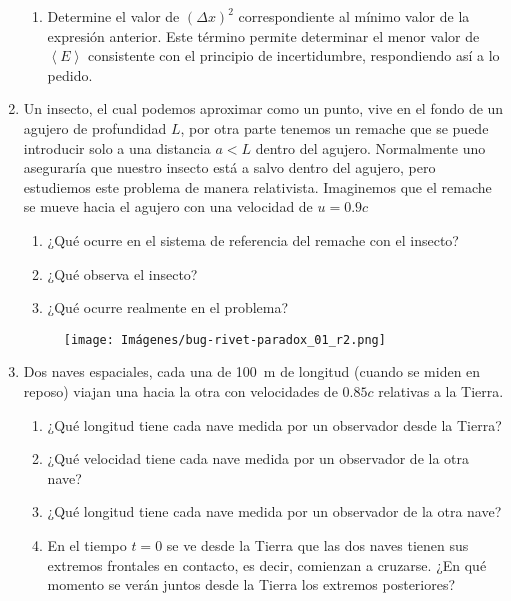 \documentclass[letterpaper,11pt]{article}
\begin{document}
\begin{enumerate}
\begin{enumerate}
    \item Determine el valor de $(\Delta x)^2$ correspondiente al mínimo valor de la expresión anterior. Este término permite determinar el menor valor de $\left<E\right>$ consistente con el principio de incertidumbre, respondiendo así a lo pedido.
\end{enumerate}

\item Un insecto, el cual podemos aproximar como un punto, vive en el fondo de un agujero de profundidad $L$, por otra parte tenemos un remache que se puede introducir solo a una distancia $a<L$ dentro del agujero. Normalmente uno aseguraría que nuestro insecto está a salvo dentro del agujero, pero estudiemos este problema de manera relativista. Imaginemos que el remache se mueve hacia el agujero con una velocidad de $u=0.9c$

\begin{multicols}{2}
    \begin{enumerate}
        \item ¿Qué ocurre en el sistema de referencia del remache con el insecto?
        \item ¿Qué observa el insecto?
        \item ¿Qué ocurre realmente en el problema?
    \end{enumerate}
    
    \columnbreak
    \begin{figure}[H]
        \centering
        \texttt{[image: Imágenes/bug-rivet-paradox\_01\_r2.png]}
    \end{figure}    
\end{multicols}

\item Dos naves espaciales, cada una de \SI{100}{\m} de longitud (cuando se miden en reposo) viajan una hacia la otra con velocidades de $0.85c$ relativas a la Tierra.

    \begin{enumerate}
        \item ¿Qué longitud tiene cada nave medida por un observador desde la Tierra?

        \item ¿Qué velocidad tiene cada nave medida por un observador de la otra nave?

        \item ¿Qué longitud tiene cada nave medida por un observador de la otra nave?

        \item En el tiempo $t=0$ se ve desde la Tierra que las dos naves tienen sus extremos frontales en contacto, es decir, comienzan a cruzarse. ¿En qué momento se verán juntos desde la Tierra los extremos posteriores?
    \end{enumerate}

\end{enumerate}
\end{document}

